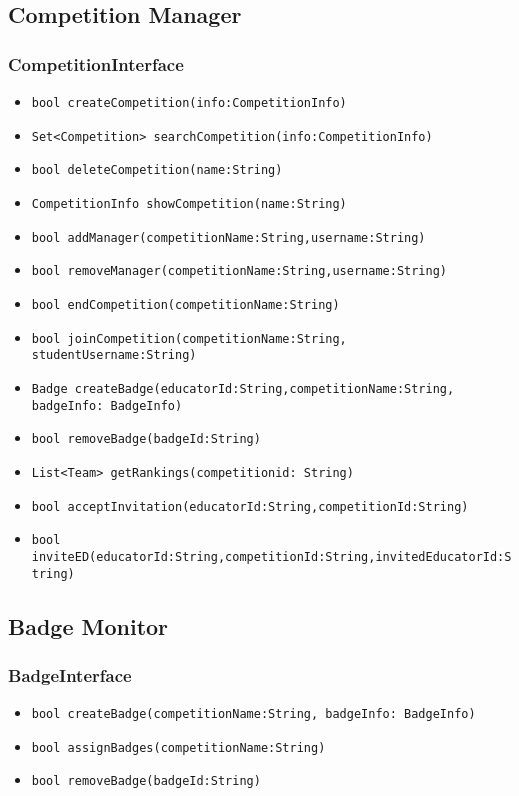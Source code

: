 \subsection{Competition Manager}
\subsubsection{CompetitionInterface}
\begin{itemize}
    \item \texttt{bool createCompetition(info:CompetitionInfo)}
    \item \texttt{Set<Competition> searchCompetition(info:CompetitionInfo)}
    \item \texttt{bool deleteCompetition(name:String)}
    \item \texttt{CompetitionInfo showCompetition(name:String)}
    \item \texttt{bool addManager(competitionName:String,username:String)}
    \item \texttt{bool removeManager(competitionName:String,username:String)}
    \item \texttt{bool endCompetition(competitionName:String)}
    \item \texttt{bool joinCompetition(competitionName:String, studentUsername:String)}
    \item \texttt{Badge createBadge(educatorId:String,competitionName:String, badgeInfo: BadgeInfo)}
    \item \texttt{bool removeBadge(badgeId:String)}
    \item \texttt{List<Team> getRankings(competitionid: String)}
    \item \texttt{bool acceptInvitation(educatorId:String,competitionId:String)}
    \item \texttt{bool inviteED(educatorId:String,competitionId:String,invitedEducatorId:String)}
\end{itemize}

\subsection{Badge Monitor}
\subsubsection{BadgeInterface}
\begin{itemize}
    \item \texttt{bool createBadge(competitionName:String, badgeInfo: BadgeInfo)}
    \item \texttt{bool assignBadges(competitionName:String)}
    \item \texttt{bool removeBadge(badgeId:String)}
\end{itemize}

